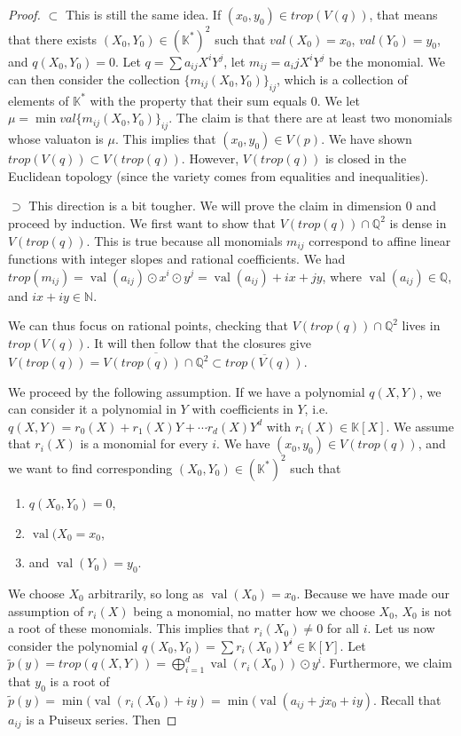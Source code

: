 \documentclass[12pt]{memoir}
\DeclareMathOperator{\val}{val}
\theoremstyle{definition}
\def\QQ{{\mathbb Q}}
\def\KK{{\mathbb K}}
\def\NN{{\mathbb N}}
\begin{document}
\begin{proof}
    $\subset$ This is still the same idea. If $(x_0,y_0)\in trop(V(q))$, that means that there exists $(X_0,Y_0)\in (\KK^*)^2$ such that $val(X_0)= x_0$, $val(Y_0)=y_0$, and $q(X_0,Y_0)=0$. Let $q = \sum a_{ij}X^iY^j$, let $m_{ij}=a_ijX^iY^j$ be the monomial. We can then consider the collection $\{m_{ij}(X_0,Y_0)\}_{ij}$, which is a collection of elements of $\KK^*$ with the property that their sum equals $0$. We let $\mu= \min  val\{m_{ij}(X_0,Y_0)\}_{ij}$. The claim is that there are at least two monomials whose valuaton is $\mu$. This implies that $(x_0,y_0) \in V(p)$. We have shown $trop(V(q)) \subset V(trop(q))$. However, $V(trop(q))$ is closed in the Euclidean topology (since the variety comes from equalities and inequalities).



    $\supset$ This direction is a bit tougher. We will prove the claim in dimension $0$ and proceed by induction. We first want to show that $V(trop(q)) \cap \QQ^2$ is dense in $V(trop(q))$. This is true because all monomials $m_{ij}$ correspond to affine linear functions with integer slopes and rational coefficients. We had $trop(m_{ij})=\val(a_{ij}) \odot x^i \odot y^j= \val(a_{ij}) + ix+jy$, where $\val(a_{ij})\in \QQ$, and $ix+iy \in \NN$.


    We can thus focus on rational points, checking that $V(trop(q)) \cap \QQ^2$ lives in $trop (V(q))$. It will then follow that the closures give $V(trop(q)) = \overline{V(trop(q)) \cap \QQ^2} \subset \overline{trop(V(q))}$.


    We proceed by the following assumption. If we have a polynomial $q(X,Y)$, we can consider it a polynomial in $Y$ with coefficients in $Y$, i.e. $q(X,Y) = r_0(X) + r_1(X)Y + \cdots r_d(X)Y^d$ with $r_i(X) \in \KK[X]$. We assume that $r_i(X)$ is a monomial for every $i$. We have $(x_0,y_0) \in V(trop(q))$, and we want to find corresponding $(X_0,Y_0)\in (\KK^*)^2$ such that 
    \begin{enumerate}
        \item $q(X_0,Y_0)=0$,
        \item $\val(X_0=x_0$, 
        \item and $\val(Y_0)=y_0.$
    \end{enumerate}

    We choose $X_0$ arbitrarily, so long as $\val(X_0)=x_0$. Because we have made our assumption of $r_i(X)$ being a monomial, no matter how we choose $X_0$, $X_0$ is not a root of these monomials. This implies that $r_i(X_0) \neq 0$ for all $i$. Let us now consider the polynomial $q(X_0,Y_0)= \sum r_i(X_0)Y^i \in \KK[Y]$. Let $\tilde{p}(y) = trop(q(X,Y)) = \bigoplus\limits_{i=1}^d\val(r_i(X_0))\odot y^i$. Furthermore, we claim that $y_0$ is a root of $\tilde{p}(y)= \min(\val(r_i(X_0) + iy) = \min(\val(a_{ij} + jx_0 + iy)$. Recall that $a_{ij}$ is a Puiseux series. Then


\end{proof}
\end{document}
